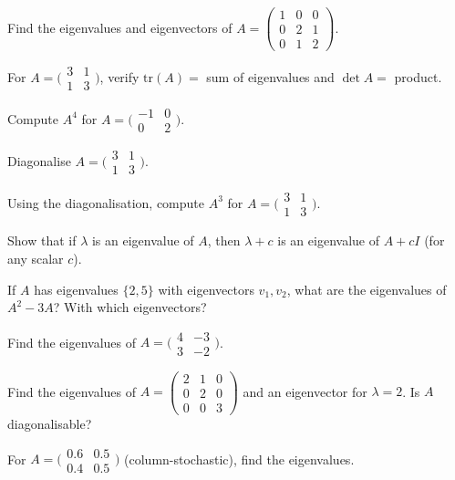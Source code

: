 \begin{problems}
  \item Find the eigenvalues and eigenvectors of $A = \begin{pmatrix} 1 & 0 & 0 \\ 0 & 2 & 1 \\ 0 & 1 & 2 \end{pmatrix}$.
  \item For $A = \bigl(\begin{smallmatrix} 3 & 1 \\ 1 & 3 \end{smallmatrix}\bigr)$, verify $\mathrm{tr}(A) = $ sum of eigenvalues and $\det A = $ product.
  \item Compute $A^{4}$ for $A = \bigl(\begin{smallmatrix} -1 & 0 \\ 0 & 2 \end{smallmatrix}\bigr)$.
  \item Diagonalise $A = \bigl(\begin{smallmatrix} 3 & 1 \\ 1 & 3 \end{smallmatrix}\bigr)$.
  \item Using the diagonalisation, compute $A^{3}$ for $A = \bigl(\begin{smallmatrix} 3 & 1 \\ 1 & 3 \end{smallmatrix}\bigr)$.
  \item Show that if $\lambda$ is an eigenvalue of $A$, then $\lambda + c$ is an eigenvalue of $A + c I$ (for any scalar $c$).
  \item If $A$ has eigenvalues $\{2, 5\}$ with eigenvectors $v_{1}, v_{2}$, what are the eigenvalues of $A^{2} - 3 A$? With which eigenvectors?
  \item Find the eigenvalues of $A = \bigl(\begin{smallmatrix} 4 & -3 \\ 3 & -2 \end{smallmatrix}\bigr)$.
  \item Find the eigenvalues of $A = \begin{pmatrix} 2 & 1 & 0 \\ 0 & 2 & 0 \\ 0 & 0 & 3 \end{pmatrix}$ and an eigenvector for $\lambda = 2$. Is $A$ diagonalisable?
  \item For $A = \bigl(\begin{smallmatrix} 0.6 & 0.5 \\ 0.4 & 0.5 \end{smallmatrix}\bigr)$ (column-stochastic), find the eigenvalues.

\end{problems}
